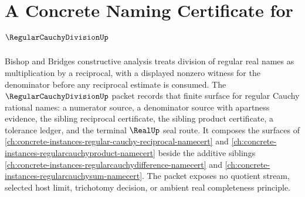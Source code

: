 \chapter{A Concrete Naming Certificate for $\RegularCauchyDivisionUp$}
\label{ch:concrete-instances-regular-cauchy-division-namecert}

Bishop and Bridges constructive analysis treats division of regular real names as multiplication by a reciprocal, with a displayed nonzero witness for the denominator before any reciprocal estimate is consumed. The $\RegularCauchyDivisionUp$ packet records that finite surface for regular Cauchy rational names: a numerator source, a denominator source with apartness evidence, the sibling reciprocal certificate, the sibling product certificate, a tolerance ledger, and the terminal $\RealUp$ seal route. It composes the surfaces of \autoref{ch:concrete-instances-regular-cauchy-reciprocal-namecert} and \autoref{ch:concrete-instances-regularcauchyproduct-namecert} beside the additive siblings \autoref{ch:concrete-instances-regularcauchydifference-namecert} and \autoref{ch:concrete-instances-regularcauchysum-namecert}. The packet exposes no quotient stream, selected host limit, trichotomy decision, or ambient real completeness principle.

